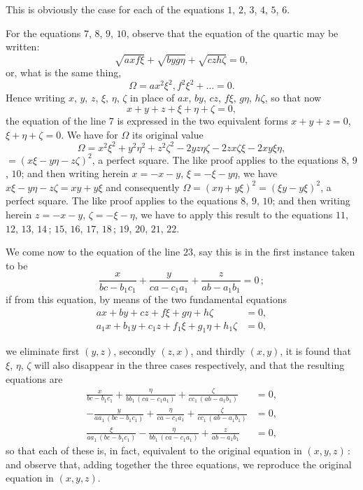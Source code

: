 \documentclass[11pt,a4paper]{article}
\providecommand{\textsc}[1]{{\scshape #1}}
\begin{document}
\medskip
This is obviously the case for each of the equations $1$, $2$, $3$, $4$, $5$, $6$.

\medskip
For the equations $7$, $8$, $9$, $10$, observe that the equation of the quartic may be written:
\[
\sqrt{axf\xi} + \sqrt{by g\eta} + \sqrt{cz h\zeta} = 0,
\]
or, what is the same thing,
\[
\Omega = a x^{2}\xi^{2},f^{2}\xi^{2} + \ldots = 0.
\]
Hence writing $x$, $y$, $z$, $\xi$, $\eta$, $\zeta$ in place of $ax$, $by$, $cz$, $f\xi$, $g\eta$, $h\zeta$, so that now
\[
x + y + z + \xi + \eta + \zeta = 0,
\]
the equation of the line $7$ is expressed in the two equivalent forms $x + y + z = 0$, $\xi + \eta + \zeta = 0$.  We have for $\Omega$ its original value
\[
\Omega = x^{2}\xi^{2} + y^{2}\eta^{2} + z^{2}\zeta^{2} - 2yz\eta\zeta - 2zx\zeta\xi - 2xy\xi\eta,
\]
$= (x\xi - y\eta - z\zeta)^{2}$, a perfect square.  The like proof applies to the equations $8$, $9$, $10$; and then writing herein $x = -x - y$, $\xi = -\xi - y\eta$, we have $x\xi - y\eta - z\zeta = xy + y\xi$ and consequently $\Omega = (x\eta + y\xi)^{2} = (\xi y - y\xi)^{2}$, a perfect square.  The like proof applies to the equations $8$, $9$, $10$; and then writing herein $z = -x - y$, $\zeta = -\xi - \eta$, we have to apply this result to the equations $11$, $12$, $13$, $14$\,; $15$, $16$, $17$, $18$\,; $19$, $20$, $21$, $22$.

\medskip
We come now to the equation of the line $23$, say this is in the first instance taken to be
\[
\frac{x}{bc - b_{1}c_{1}} + \frac{y}{ca - c_{1}a_{1}} + \frac{z}{ab - a_{1}b_{1}} = 0\,;
\]
if from this equation, by means of the two fundamental equations
\[
\begin{aligned}
ax + by + cz + f\xi + g\eta + h\zeta &= 0,\\
a_{1}x + b_{1}y + c_{1}z + f_{1}\xi + g_{1}\eta + h_{1}\zeta &= 0,
\end{aligned}
\]
\clearpage

\fancyhead[L]{\small 816]}
\fancyhead[C]{\small\textsc{on the bitangents of a plane quartic.}}

\thispagestyle{plain}
\noindent we eliminate first $(y, z)$, secondly $(z, x)$, and thirdly $(x, y)$, it is found that $\xi$, $\eta$, $\zeta$ will also disappear in the three cases respectively, and that the resulting equations are
\[
\begin{aligned}
\frac{x}{bc - b_{1}c_{1}} + \frac{\eta}{bb_{1}\,(ca - c_{1}a_{1})} + \frac{\zeta}{cc_{1}\,(ab - a_{1}b_{1})} &= 0,\\
-\frac{y}{aa_{1}\,(bc - b_{1}c_{1})} + \frac{\eta}{ca - c_{1}a_{1}} + \frac{\zeta}{cc_{1}\,(ab - a_{1}b_{1})} &= 0,\\
\frac{\xi}{aa_{1}\,(bc - b_{1}c_{1})} - \frac{\eta}{bb_{1}\,(ca - c_{1}a_{1})} + \frac{z}{ab - a_{1}b_{1}} &= 0,
\end{aligned}
\]
so that each of these is, in fact, equivalent to the original equation in $(x, y, z)$\,: and observe that, adding together the three equations, we reproduce the original equation in $(x, y, z)$.
\end{document}

